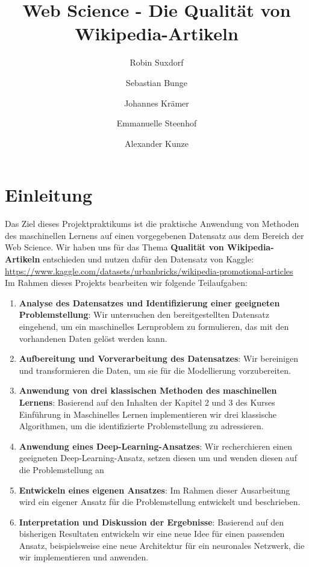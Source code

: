 \documentclass[researchlab,palatino]{AIGpaper}
\author{Robin Suxdorf \and Sebastian Bunge \and Johannes Krämer \and Emmanuelle Steenhof \and Alexander Kunze}
\title{Web Science - Die Qualität von Wikipedia-Artikeln}
\begin{document}
\maketitle %



\section{Einleitung}

Das Ziel dieses Projektpraktikums ist die praktische Anwendung von Methoden des maschinellen Lernens auf einen vorgegebenen Datensatz aus dem Bereich der Web Science. Wir haben uns für das Thema \textbf{Qualität von Wikipedia-Artikeln} entschieden und nutzen dafür den Datensatz von Kaggle: \url{https://www.kaggle.com/datasets/urbanbricks/wikipedia-promotional-articles}\\
Im Rahmen dieses Projekts bearbeiten wir folgende Teilaufgaben:

\begin{enumerate} 
\item \textbf{Analyse des Datensatzes und Identifizierung einer geeigneten Problemstellung}: Wir untersuchen den bereitgestellten Datensatz eingehend, um ein maschinelles Lernproblem zu formulieren, das mit den vorhandenen Daten gelöst werden kann. 
\item \textbf{Aufbereitung und Vorverarbeitung des Datensatzes}: Wir bereinigen und transformieren die Daten, um sie für die Modellierung vorzubereiten. 
\item \textbf{Anwendung von drei klassischen Methoden des maschinellen Lernens}: Basierend auf den Inhalten der Kapitel 2 und 3 des Kurses \glqq Einführung in Maschinelles Lernen\grqq{} implementieren wir drei klassische Algorithmen, um die identifizierte Problemstellung zu adressieren. 
\item \textbf{Anwendung eines Deep-Learning-Ansatzes}: Wir recherchieren einen geeigneten Deep-Learning-Ansatz, setzen diesen um und wenden diesen auf die Problemstellung an
\item \textbf{Entwickeln eines eigenen Ansatzes}: Im Rahmen dieser Ausarbeitung wird ein eigener Ansatz für die Problemstellung entwickelt und beschrieben. 
\item \textbf{Interpretation und Diskussion der Ergebnisse}: Basierend auf den bisherigen Resultaten entwickeln wir eine neue Idee für einen passenden Ansatz, beispielsweise eine neue Architektur für ein neuronales Netzwerk, die wir implementieren und anwenden. \end{enumerate}
\end{document}
